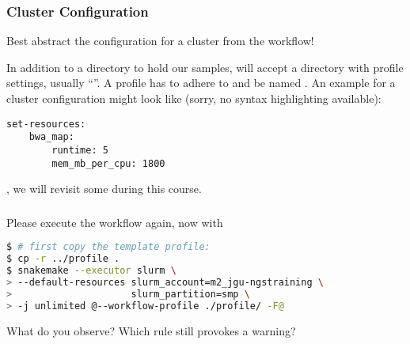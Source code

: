 \begin{frame}[fragile]
  \frametitle{Cluster Configuration}
  \begin{hint}
  	Best abstract the configuration for a cluster from the workflow!
  \end{hint}
  In addition to a  directory to hold our samples, \Snakemake{} will accept a directory with profile settings, usually ``''.
  \pause
  A profile has to adhere to  and be named . An example for a cluster configuration might look like (sorry, no syntax highlighting available):
  \begin{lstlisting}[style=Plain]
set-resources:
    bwa_map:
        runtime: 5
        mem_mb_per_cpu: 1800
  \end{lstlisting}
  \pause
  
  \Snakemake{} , we will revisit some during this course.

\end{frame}

\begin{frame}[fragile]
  \frametitle{}
  Please execute the workflow again, now with 
  \begin{lstlisting}[language=Bash, style=Shell, basicstyle=\footnotesize]
$ # first copy the template profile:
$ cp -r ../profile .
$ snakemake --executor slurm \
> --default-resources slurm_account=m2_jgu-ngstraining \
>                     slurm_partition=smp \
> -j unlimited @--workflow-profile ./profile/ -F@
  \end{lstlisting}
  \begin{question}
  	What do you observe? Which rule still provokes a warning?
  \end{question}
\end{frame}

